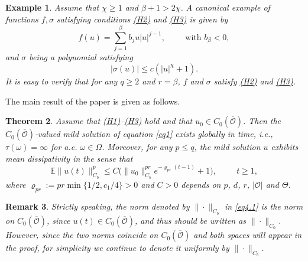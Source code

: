 \documentclass[10pt]{article}
\numberwithin{figure}{section}
\numberwithin{equation}{section}
\newtheorem{theorem}{Theorem}[section]
\newtheorem{remark}[theorem]{Remark}
\newtheorem{example}[theorem]{Example}
\newcommand{\cO}{{\mathcal O}}
\newcommand{\0}{{\theta}}
\def\bt{\begin{theorem}}
\def\et{\end{theorem}}
\def\b{\beta}
\def\w{\omega}
\def\W{\Omega}
\def\.{\cdot}
\def\8{\infty}
\def\Hs{\hspace{1cm}}\def\hs{\hspace{0.5cm}}
\def\Vs{\vskip8pt}\def\vs{\vskip4pt}
\def\({\left(}\def\){\right)}
\begin{document}
\begin{example}\label{ex1}
Assume that $\chi\ge1$ and $\beta+1> 2\chi$. A canonical example of functions $f,\sigma$ satisfying conditions \hyperref[H2]{(H2)} and \hyperref[H3]{(H3)} is given by
$$
f(u) = \sum_{j=1}^{\beta} b_j u|u|^{j-1}, \Hs \text{with } b_\beta < 0,
$$
and $\sigma$ being a polynomial satisfying
$$
|\sigma(u)| \leq c(|u|^\chi + 1).
$$It is easy to verify that for {\sl any} $q \ge2$ and $r = \beta$,  $f$ and $\sigma$ satisfy \hyperref[H2]{(H2)} and \hyperref[H3]{(H3)}.
\end{example}
The main result of the paper is given as follows.
\begin{theorem}\label{th}
Assume that \hyperref[H1]{(H1)}--\hyperref[H3]{(H3)} hold and that $u_0 \in C_0(\overline{\cO})$. 
Then the $C_0(\overline{\mathcal{O}})$-valued mild solution of equation \eqref{eq1} exists globally in time, i.e., $\tau(\w)=\8$ for a.e. $\w\in\W$. Moreover, for any $p\le q$, the mild solution $u$ exhibits mean dissipativity in the sense that
\begin{equation}\label{eq4.1}
\mathbb{E}\| u(t) \|_{C_b}^p \le C \big(\| u_0 \|_{C_b}^{pr} e^{-\varrho_{pr}(t-1)} + 1 \big), \Hs t \ge 1,
\end{equation}
where $\varrho_{pr}:=pr\min\{1/2,c_1/4\}>0$  and $C> 0$ depends on $p$, $d$, $r$, $|\mathcal{O}|$ and $\Theta$.
\end{theorem}
\begin{remark}
Strictly speaking, the norm denoted by $\|\cdot\|_{C_b}$ in  \eqref{eq4.1} is the norm on $C_0(\overline{\cO})$, since $u(t)\in C_0(\overline{\cO}) $, and thus should be written as $\|\.\|_{C_0}$. However, since the two norms coincide on $C_0(\overline{\cO})$ and both spaces will appear in the proof, for simplicity we continue to denote it uniformly by $\|\cdot\|_{C_b}$.
\end{remark}

\end{document}
